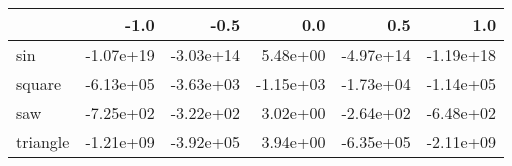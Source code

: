 \begin{tabular}{lrrrrr}
\toprule
{} &      -1.0 &      -0.5 &       0.0 &       0.5 &       1.0 \\
\midrule
sin      & -1.07e+19 & -3.03e+14 &  5.48e+00 & -4.97e+14 & -1.19e+18 \\
square   & -6.13e+05 & -3.63e+03 & -1.15e+03 & -1.73e+04 & -1.14e+05 \\
saw      & -7.25e+02 & -3.22e+02 &  3.02e+00 & -2.64e+02 & -6.48e+02 \\
triangle & -1.21e+09 & -3.92e+05 &  3.94e+00 & -6.35e+05 & -2.11e+09 \\
\bottomrule
\end{tabular}
